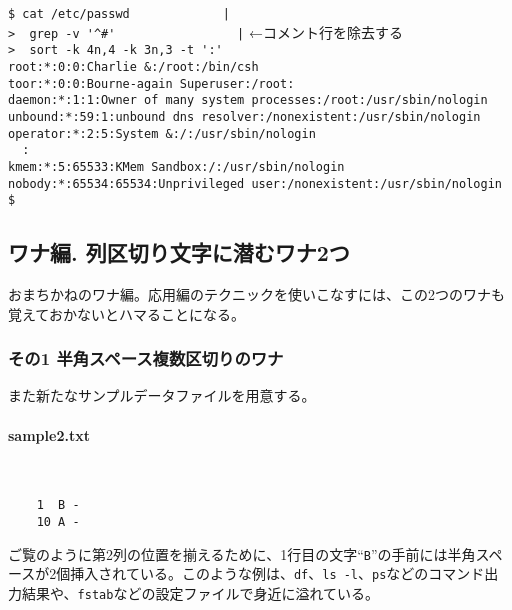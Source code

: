 \begin{screen}
	\verb!$ cat /etc/passwd             |! \return \\
	\verb!>  grep -v '^#'                 |! \return   ←コメント行を除去する \\
	\verb!>  sort -k 4n,4 -k 3n,3 -t ':'! \return \\
	\verb!root:*:0:0:Charlie &:/root:/bin/csh! \\
	\verb!toor:*:0:0:Bourne-again Superuser:/root:! \\
	\verb!daemon:*:1:1:Owner of many system processes:/root:/usr/sbin/nologin! \\
	\verb!unbound:*:59:1:unbound dns resolver:/nonexistent:/usr/sbin/nologin! \\
	\verb!operator:*:2:5:System &:/:/usr/sbin/nologin! \\
	\verb!  :! \\
	\verb!kmem:*:5:65533:KMem Sandbox:/:/usr/sbin/nologin! \\
	\verb!nobody:*:65534:65534:Unprivileged user:/nonexistent:/usr/sbin/nologin! \\
	\verb!$ !
\end{screen}

\subsection*{ワナ編. 列区切り文字に潜むワナ2つ}

おまちかねのワナ編。応用編のテクニックを使いこなすには、この2つのワナも覚えておかないとハマることになる。

\subsubsection*{その1 半角スペース複数区切りのワナ}

また新たなサンプルデータファイルを用意する。

\paragraph{sample2.txt} 　\\
\begin{frameboxit}{160.0mm}
\begin{verbatim}
	1  B -
	10 A -
\end{verbatim}
\end{frameboxit}

ご覧のように第2列の位置を揃えるために、1行目の文字``\verb|B|''の手前には半角スペースが2個挿入されている。このような例は、\verb|df|、\verb|ls -l|、\verb|ps|などのコマンド出力結果や、\verb|fstab|などの設定ファイルで身近に溢れている。


